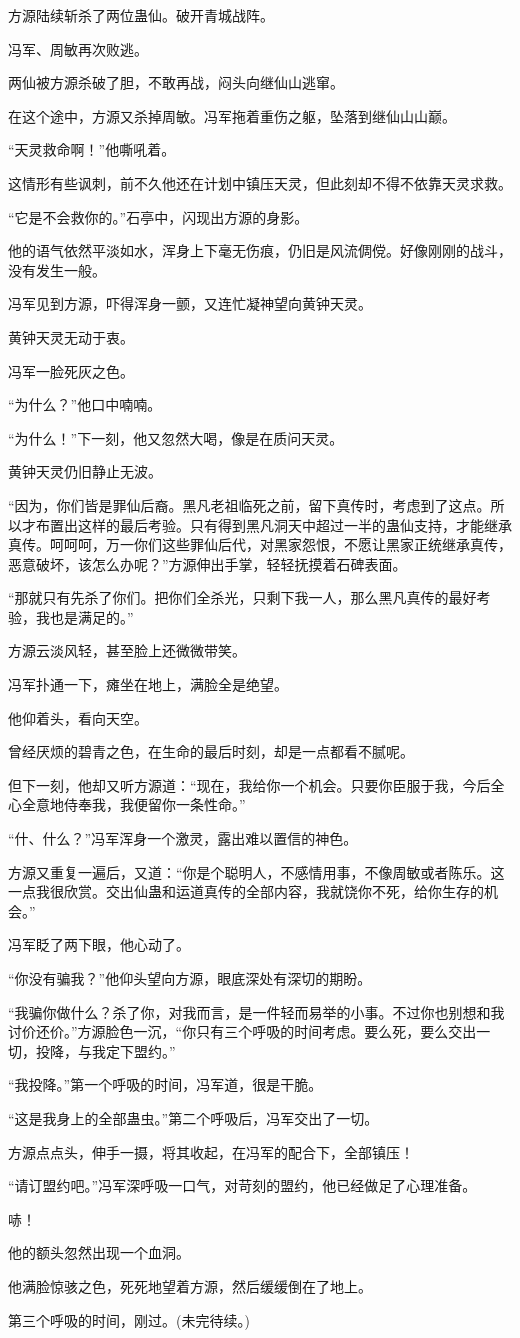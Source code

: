 \begin{this_body}
方源陆续斩杀了两位蛊仙。破开青城战阵。

冯军、周敏再次败逃。

两仙被方源杀破了胆，不敢再战，闷头向继仙山逃窜。

在这个途中，方源又杀掉周敏。冯军拖着重伤之躯，坠落到继仙山山巅。

“天灵救命啊！”他嘶吼着。

这情形有些讽刺，前不久他还在计划中镇压天灵，但此刻却不得不依靠天灵求救。

“它是不会救你的。”石亭中，闪现出方源的身影。

他的语气依然平淡如水，浑身上下毫无伤痕，仍旧是风流倜傥。好像刚刚的战斗，没有发生一般。

冯军见到方源，吓得浑身一颤，又连忙凝神望向黄钟天灵。

黄钟天灵无动于衷。

冯军一脸死灰之色。

“为什么？”他口中喃喃。

“为什么！”下一刻，他又忽然大喝，像是在质问天灵。

黄钟天灵仍旧静止无波。

“因为，你们皆是罪仙后裔。黑凡老祖临死之前，留下真传时，考虑到了这点。所以才布置出这样的最后考验。只有得到黑凡洞天中超过一半的蛊仙支持，才能继承真传。呵呵呵，万一你们这些罪仙后代，对黑家怨恨，不愿让黑家正统继承真传，恶意破坏，该怎么办呢？”方源伸出手掌，轻轻抚摸着石碑表面。

“那就只有先杀了你们。把你们全杀光，只剩下我一人，那么黑凡真传的最好考验，我也是满足的。”

方源云淡风轻，甚至脸上还微微带笑。

冯军扑通一下，瘫坐在地上，满脸全是绝望。

他仰着头，看向天空。

曾经厌烦的碧青之色，在生命的最后时刻，却是一点都看不腻呢。

但下一刻，他却又听方源道：“现在，我给你一个机会。只要你臣服于我，今后全心全意地侍奉我，我便留你一条性命。”

“什、什么？”冯军浑身一个激灵，露出难以置信的神色。

方源又重复一遍后，又道：“你是个聪明人，不感情用事，不像周敏或者陈乐。这一点我很欣赏。交出仙蛊和运道真传的全部内容，我就饶你不死，给你生存的机会。”

冯军眨了两下眼，他心动了。

“你没有骗我？”他仰头望向方源，眼底深处有深切的期盼。

“我骗你做什么？杀了你，对我而言，是一件轻而易举的小事。不过你也别想和我讨价还价。”方源脸色一沉，“你只有三个呼吸的时间考虑。要么死，要么交出一切，投降，与我定下盟约。”

“我投降。”第一个呼吸的时间，冯军道，很是干脆。

“这是我身上的全部蛊虫。”第二个呼吸后，冯军交出了一切。

方源点点头，伸手一摄，将其收起，在冯军的配合下，全部镇压！

“请订盟约吧。”冯军深呼吸一口气，对苛刻的盟约，他已经做足了心理准备。

哧！

他的额头忽然出现一个血洞。

他满脸惊骇之色，死死地望着方源，然后缓缓倒在了地上。

第三个呼吸的时间，刚过。(未完待续。)

\end{this_body}

